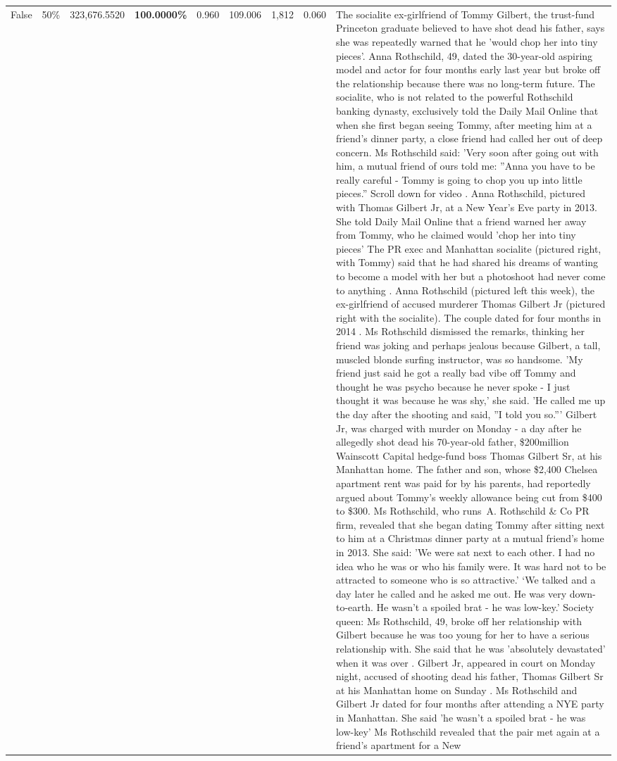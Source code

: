 \begin{table}[H]
\begin{tabular}{lllrlllll}
False & 50\% & 323,676.5520 & \bfseries \color{red} 100.0000\% & 0.960 & 109.006 & 1,812 & 0.060 & The socialite ex-girlfriend of Tommy Gilbert, the trust-fund Princeton graduate believed to have shot dead his father, says she was repeatedly warned that he 'would chop her into tiny pieces'. Anna Rothschild, 49, dated the 30-year-old aspiring model and actor for four months early last year but broke off the relationship because there was no long-term future. The socialite, who is not related to the powerful Rothschild banking dynasty, exclusively told the Daily Mail Online that when she first began seeing Tommy, after meeting him at a friend's dinner party, a close friend had called her out of deep concern. Ms Rothschild said: 'Very soon after going out with him, a mutual friend of ours told me: ''Anna you have to be really careful - Tommy is going to chop you up into little pieces.'' Scroll down for video . Anna Rothschild, pictured with Thomas Gilbert Jr, at a New Year's Eve party in 2013. She told Daily Mail Online that a friend warned her away from Tommy, who he claimed would 'chop her into tiny pieces' The PR exec and Manhattan socialite (pictured right, with Tommy) said that he had shared his dreams of wanting to become a model with her but a photoshoot had never come to anything . Anna Rothschild (pictured left this week), the ex-girlfriend of accused murderer Thomas Gilbert Jr (pictured right with the socialite). The couple dated for four months in 2014 . Ms Rothschild dismissed the remarks, thinking her friend was joking and perhaps jealous because Gilbert, a tall, muscled blonde surfing instructor, was so handsome. 'My friend just said he got a really bad vibe off Tommy and thought he was psycho because he never spoke - I just thought it was because he was shy,' she said. 'He called me up the day after the shooting and said, ''I told you so.''' Gilbert Jr, was charged with murder on Monday - a day after he allegedly shot dead his 70-year-old father, \$200million Wainscott Capital hedge-fund boss Thomas Gilbert Sr, at his Manhattan home. The father and son, whose \$2,400 Chelsea apartment rent was paid for by his parents, had reportedly argued about Tommy's weekly allowance being cut from \$400 to \$300. Ms Rothschild, who runs A. Rothschild \& Co PR firm, revealed that she began dating Tommy after sitting next to him at a Christmas dinner party at a mutual friend's home in 2013. She said: 'We were sat next to each other. I had no idea who he was or who his family were. It was hard not to be attracted to someone who is so attractive.' ‘We talked and a day later he called and he asked me out. He was very down-to-earth. He wasn’t a spoiled brat - he was low-key.’ Society queen: Ms Rothschild, 49, broke off her relationship with Gilbert because he was too young for her to have a serious relationship with. She said that he was 'absolutely devastated' when it was over . Gilbert Jr, appeared in court on Monday night, accused of shooting dead his father, Thomas Gilbert Sr at his Manhattan home on Sunday . Ms Rothschild and Gilbert Jr dated for four months after attending a NYE party in Manhattan. She said 'he wasn't a spoiled brat - he was low-key' Ms Rothschild revealed that the pair met again at a friend’s apartment for a New 
\end{tabular}
\end{table}

